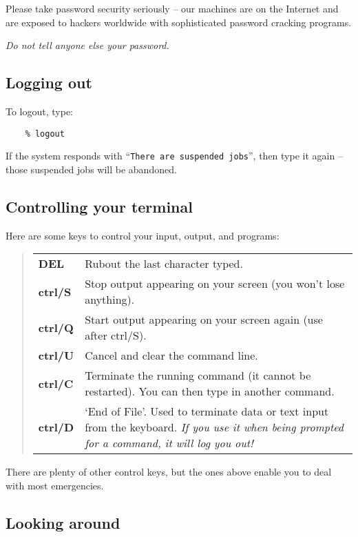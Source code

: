 Please take password security seriously -- our machines are on the 
Internet and are exposed to hackers worldwide with sophisticated 
password cracking programs.

{\em Do not tell anyone else your password.}

\subsection{Logging out}

To logout, type:
\begin{verbatim}
    % logout
\end{verbatim}
If the system responds with ``{\tt There are suspended jobs}'', then type it
again -- those suspended jobs will be abandoned.

\subsection{Controlling your terminal}

Here are some keys to control your input, output, and programs:

\begin{quote}
\begin{tabular}{lp{72mm}}

{\bf DEL} & Rubout the last character typed.\\
{\bf  ctrl/S} & Stop output appearing on your screen (you won't lose
  anything).\\
{\bf  ctrl/Q} & Start output appearing on your screen again (use after
  ctrl/S).\\
{\bf  ctrl/U} & Cancel and clear the command line.\\
{\bf  ctrl/C} & Terminate the running command (it cannot be restarted).
  You can then type in another command.\\
{\bf  ctrl/D} & `End of File'. Used to terminate data or text input from
  the keyboard. {\em If you use it when being prompted for a command, it will
  log you out!}
\end{tabular}
\end{quote}
There are plenty of other control keys, but the ones above enable you to deal
with most emergencies.

\subsection{Looking around}

